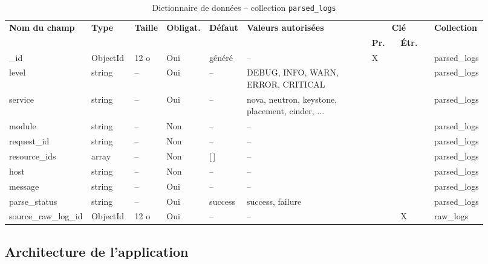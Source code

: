 \documentclass[a4paper,11pt,oneside]{report}
\begin{document}
\begin{table}[htbp]
\centering
\caption{Dictionnaire de données -- collection \texttt{parsed\_logs}}
\begin{adjustbox}{width=\textwidth}
\small
\begin{tabular}{p{0.15\linewidth} p{0.09\linewidth} p{0.05\linewidth} p{0.07\linewidth} p{0.07\linewidth} p{0.26\linewidth} p{0.06\linewidth} p{0.07\linewidth} p{0.10\linewidth}}
\toprule
\multirow{2}{1.5cm}{\raggedright\textbf{Nom du champ}} & \multirow{2}{0.9cm}{\raggedright\textbf{Type}} & \multirow{2}{0.5cm}{\raggedright\textbf{Taille}} & \multirow{2}{0.7cm}{\raggedright\textbf{Obligat.}} & \multirow{2}{0.7cm}{\raggedright\textbf{Défaut}} & \multirow{2}{2.6cm}{\raggedright\textbf{Valeurs autorisées}} & \multicolumn{2}{c}{\textbf{Clé}} & \multirow{2}{1.0cm}{\raggedright\textbf{Collection}} \\
\cmidrule(lr){7-8}
 & & & & & & \textbf{Pr.} & \textbf{Étr.} & \\
\midrule
\_id & ObjectId & 12 o & Oui & généré & -- & X & & parsed\_logs \\
level & string & -- & Oui & -- & DEBUG, INFO, WARN, ERROR, CRITICAL & & & parsed\_logs \\
service & string & -- & Oui & -- & nova, neutron, keystone, placement, cinder, ... & & & parsed\_logs \\
module & string & -- & Non & -- & -- & & & parsed\_logs \\
request\_id & string & -- & Non & -- & -- & & & parsed\_logs \\
resource\_ids & array & -- & Non & [\,] & -- & & & parsed\_logs \\
host & string & -- & Non & -- & -- & & & parsed\_logs \\
message & string & -- & Oui & -- & -- & & & parsed\_logs \\
parse\_status & string & -- & Oui & success & success, failure & & & parsed\_logs \\
source\_raw\_log\_id & ObjectId & 12 o & Oui & -- & -- & & X & raw\_logs \\
\bottomrule
\end{tabular}
\end{adjustbox}
\end{table}

\subsection{Architecture de l'application}
\end{document}
